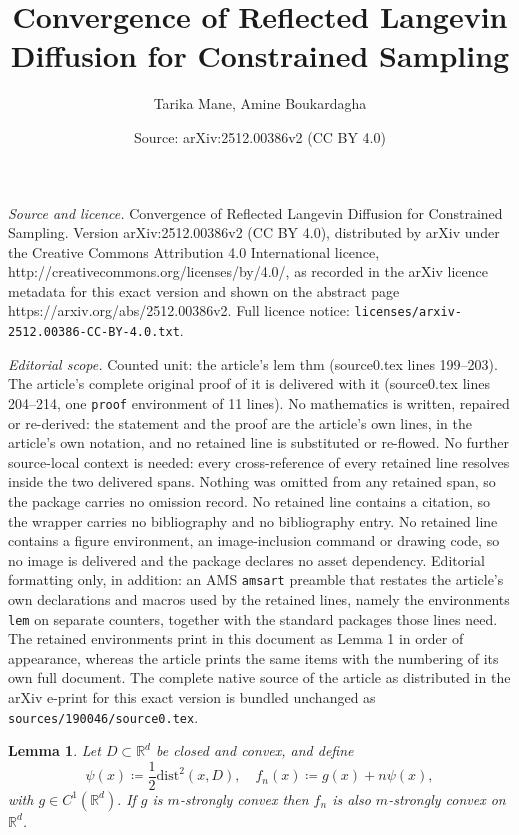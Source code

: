 \documentclass[10pt,a4paper]{amsart}
\title{Convergence of Reflected Langevin Diffusion for Constrained Sampling}
\author{Tarika Mane, Amine Boukardagha}
\date{Source: arXiv:2512.00386v2 (CC BY 4.0)}
\newtheorem{lem}{Lemma}
\newcommand{\bbR}{\mathbb{R}}
\newcommand{\dist}{\text{dist}}
\begin{document}
\maketitle

\noindent\emph{Source and licence.} Convergence of Reflected Langevin Diffusion for Constrained Sampling. Version arXiv:2512.00386v2 (CC BY 4.0), distributed by arXiv under the Creative Commons Attribution 4.0 International licence, http://creativecommons.org/licenses/by/4.0/, as recorded in the arXiv licence metadata for this exact version and shown on the abstract page https://arxiv.org/abs/2512.00386v2. Full licence notice: \texttt{licenses/arxiv-2512.00386-CC-BY-4.0.txt}.\par\smallskip

\noindent\textit{Editorial scope.} Counted unit: the article's lem thm (source0.tex lines 199--203). The article's complete original proof of it is delivered with it (source0.tex lines 204--214, one \texttt{proof} environment of 11 lines). No mathematics is written, repaired or re-derived: the statement and the proof are the article's own lines, in the article's own notation, and no retained line is substituted or re-flowed.  No further source-local context is needed: every cross-reference of every retained line resolves inside the two delivered spans.  Nothing was omitted from any retained span, so the package carries no omission record.  No retained line contains a citation, so the wrapper carries no bibliography and no bibliography entry.  No retained line contains a figure environment, an image-inclusion command or drawing code, so no image is delivered and the package declares no asset dependency.  Editorial formatting only, in addition: an AMS \texttt{amsart} preamble that restates the article's own declarations and macros used by the retained lines, namely the environments \texttt{lem} on separate counters, together with the standard packages those lines need.  The retained environments print in this document as Lemma 1 in order of appearance, whereas the article prints the same items with the numbering of its own full document.  The complete native source of the article as distributed in the arXiv e-print for this exact version is bundled unchanged as \texttt{sources/190046/source0.tex}.
\begin{lem}\label{f convex thm}
    Let $D \subset \bbR^d$ be closed and convex, and define \[
    \psi(x) \coloneqq \frac{1}{2}\dist^2(x,D), \quad f_n(x) \coloneqq g(x) + n\psi(x),
    \] with $g \in C^1(\bbR^d).$ If $g$ is $m$-strongly convex then $f_n$ is also $m$-strongly convex on $\bbR^d$.
\end{lem}
\end{document}
